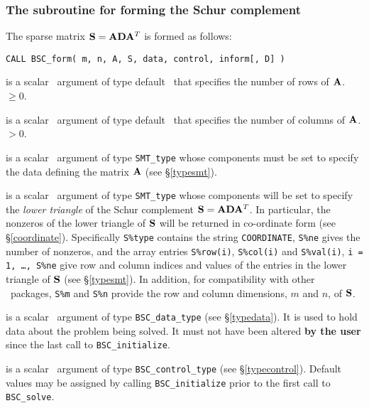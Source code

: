 \documentclass{galahad}
\newcommand{\packagename}{BSC}
\begin{document}

\subsubsection{The subroutine for forming the Schur complement}
The sparse matrix ${\mathbf{S}} = {\mathbf{A}} {\mathbf{D}} {\mathbf{A}}^T$ is formed as follows:
\vspace*{1mm}

\hspace{8mm}
{\tt CALL \packagename\_form( m, n, A, S, data, control, inform[, D] )}

\begin{description}
 is a scalar \intentin\ argument of type default \integer\ that specifies
the number of rows of ${\mathbf{A}}$.
 $\geq 0$.

 is a scalar \intentin\ argument of type default \integer\ that specifies
the number of columns of ${\mathbf{A}}$.
 $> 0$.

 is a scalar \intentin\ argument of type {\tt SMT\_type} whose
components must be set to specify the data defining the matrix ${\mathbf{A}}$
(see \S\ref{typesmt}).

 is a scalar \intentout\ argument of type {\tt SMT\_type} whose
components will be set to specify the {\em lower triangle} of the
Schur complement ${\mathbf{S}} = {\mathbf{A}} {\mathbf{D}} {\mathbf{A}}^T$. In particular,
the nonzeros of the lower triangle of ${\mathbf{S}}$ will be returned
in co-ordinate form (see \S\ref{coordinate}). Specifically
{\tt S\%type} contains the string
{\tt COORDINATE}, {\tt S\%ne} gives the number of nonzeros,
and the array entries {\tt S\%row(i)}, {\tt S\%col(i)} and
{\tt S\%val(i)}, {\tt i = 1, \ldots, S\%ne} give row and column
indices and values of the entries in the lower triangle of ${\mathbf{S}}$
(see \S\ref{typesmt}). In addition, for compatibility with other
\galahad\ packages, {\tt S\%m} and {\tt S\%n} provide the row and column
dimensions, $m$ and $n$, of ${\mathbf{S}}$.

 is a scalar \intentinout\ argument of type
{\tt \packagename\_data\_type}
(see \S\ref{typedata}). It is used to hold data about the problem being
solved. It must not have been altered {\bf by the user} since the last call to
{\tt \packagename\_initialize}.

 is a scalar \intentin\ argument of type
{\tt \packagename\_control\_type}
(see \S\ref{typecontrol}). Default values may be assigned by calling
{\tt \packagename\_initialize} prior to the first call to
{\tt \packagename\_solve}.


\end{description}
\end{document}
